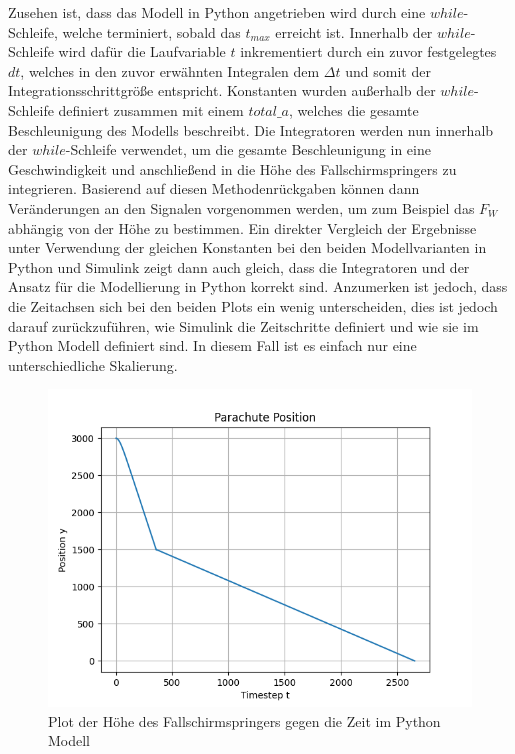 \documentclass[]{iat}
\begin{document}
Zusehen ist, dass das Modell in Python angetrieben wird durch eine $while$-Schleife, welche terminiert, sobald das $t_{max}$ erreicht ist. Innerhalb der $while$-Schleife wird dafür die Laufvariable $t$ inkrementiert durch ein zuvor festgelegtes $dt$, welches in den zuvor erwähnten Integralen dem $\Delta t$ und somit der Integrationsschrittgröße entspricht. Konstanten wurden außerhalb der $while$-Schleife definiert zusammen mit einem $total\_a$, welches die gesamte Beschleunigung des Modells beschreibt. Die Integratoren werden nun innerhalb der $while$-Schleife verwendet, um die gesamte Beschleunigung in eine Geschwindigkeit und anschließend in die Höhe des Fallschirmspringers zu integrieren. Basierend auf diesen Methodenrückgaben können dann Veränderungen an den Signalen vorgenommen werden, um zum Beispiel das $F_W$ abhängig von der Höhe zu bestimmen. Ein direkter Vergleich der Ergebnisse unter Verwendung der gleichen Konstanten bei den beiden Modellvarianten in Python und Simulink zeigt dann auch gleich, dass die Integratoren und der Ansatz für die Modellierung in Python korrekt sind. Anzumerken ist jedoch, dass die Zeitachsen sich bei den beiden Plots ein wenig unterscheiden, dies ist jedoch darauf zurückzuführen, wie Simulink die Zeitschritte definiert und wie sie im Python Modell definiert sind. In diesem Fall ist es einfach nur eine unterschiedliche Skalierung.
\begin{figure}[H]
    \includegraphics[width=\textwidth]{graphics/python_parachute_s_plot.png}
    \centering
    \caption{Plot der Höhe des Fallschirmspringers gegen die Zeit im Python Modell}
    \label{abb:python_parachute_s_plot}
\end{figure}
\end{document}
